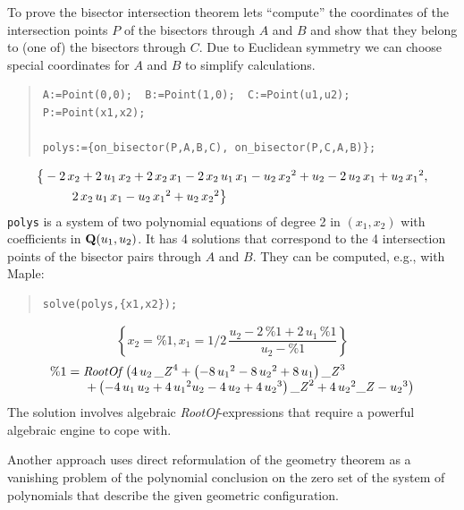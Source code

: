 \documentclass[11pt]{article}
\newcommand{\formel}[1]{\[\begin{array}{l}#1\end{array}\]}
\newcommand{\hsp}{\hspace*{1cm}}
\begin{document}
To prove the bisector intersection theorem lets ``compute'' the coordinates of
the intersection points $P$ of the bisectors through $A$ and $B$ and show that
they belong to (one of) the bisectors through $C$.  Due to Euclidean symmetry
we can choose special coordinates for $A$ and $B$ to simplify calculations.
\begin{quote}
\begin{verbatim}
A:=Point(0,0);  B:=Point(1,0);  C:=Point(u1,u2); P:=Point(x1,x2);

polys:={on_bisector(P,A,B,C), on_bisector(P,C,A,B)};
\end{verbatim}
\end{quote}\vspace{-8pt}
\formel{\big\{ -2\,{x_2}+2\,{u_1}\,{x_2}+2\,{x_2}\,{x_1}
  -2\,{x_2}\,{u_1}\,{x_1} -{u_2}\,{{x_2}}^{2}+{u_2}-2\,
  {u_2}\,{x_1}+{u_2}\,{{x_1}}^{2},\\[4pt]\hsp 2\,{x_2}\,{u_1}\,{x_1}
  -{u_2}\,{{x_1}}^{2}+{u_2}\,{{x_2}}^{2}\big\}} 
{\tt polys} is a system of two polynomial equations of degree 2 in $(x_1,x_2)$
with coefficients in ${\bf Q}(u_1,u_2)$. It has 4 solutions that correspond to
the 4 intersection points of the bisector pairs through $A$ and $B$. They can
be computed, e.g., with Maple:
\begin{quote}
\begin{verbatim}
solve(polys,{x1,x2});
\end{verbatim}
\end{quote}
\[\left\{ {x_2}=\%1, {x_1}=1/2\,{\frac {{ u_2}-2\,\%1
      +2\,{u_1}\,\%1 }{{u_2}-\%1}}\right\}\] \formel{\%1 = {\it RootOf} \left(
    4\,{u_2}\,{{\it \_Z}}^{4}+ \left( -8\,{{u_1}}^{2}-8\,{{u_2}}^{2}+8\,{u_1}
    \right) {{ \it \_Z}}^{3} \right. \\\hsp\left.  + \left( -4\,{u_1}\,{u_2}
      +4\,{{u_1}}^{2}{u_2} -4\,{u_2} +4\,{{u_2}}^{3} \right) {{\it \_Z}}^{2}
    +4\,{{u_2}}^{2}{\it \_Z}-{{u_2}}^{3} \right)} The solution involves
algebraic {\it RootOf\/}-expressions that require a powerful algebraic engine
to cope with.

Another approach uses direct reformulation of the geometry theorem as a
vanishing problem of the polynomial conclusion on the zero set of the system
of polynomials that describe the given geometric configuration.
\end{document}
